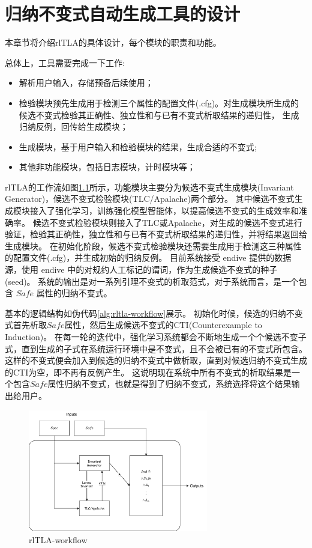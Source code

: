 \chapter{归纳不变式自动生成工具的设计}\label{chap:design}

本章节将介绍rlTLA的具体设计，每个模块的职责和功能。

总体上，工具需要完成一下工作:
\begin{itemize}
    \item 解析用户输入，存储预备后续使用；
    \item 检验模块预先生成用于检测三个属性的配置文件(.cfg)。对生成模块所生成的候选不变式检验其正确性、独立性和与已有不变式析取结果的递归性，
    生成归纳反例，回传给生成模块；
    \item 生成模块，基于用户输入和检验模块的结果，生成合适的不变式;
    \item 其他非功能模块，包括日志模块，计时模块等；
\end{itemize}

rlTLA的工作流如图\ref{fig:rltla}所示，功能模块主要分为候选不变式生成模块(Invariant Generator)，候选不变式检验模块(TLC/Apalache)两个部分。
其中候选不变式生成模块接入了强化学习，训练强化模型智能体，以提高候选不变式的生成效率和准确率。
候选不变式检验模块则接入了TLC或Apalache，对生成的候选不变式进行验证，检验其正确性，独立性和与已有不变式析取结果的递归性，并将结果返回给生成模块。
在初始化阶段，候选不变式检验模块还需要生成用于检测这三种属性的配置文件(.cfg)，并生成初始的归纳反例。
目前系统接受 endive 提供的数据源，使用 endive 中的对规约人工标记的谓词，作为生成候选不变式的种子(seed)。
系统的输出是对一系列引理不变式的析取范式，对于系统而言，是一个包含 $Safe$ 属性的归纳不变式。

基本的逻辑结构如伪代码\ref{alg:rltla-workflow}展示。
初始化时候，候选的归纳不变式首先析取$Safe$属性，然后生成候选不变式的CTI(Counterexample to Induction)。
在每一轮的迭代中，强化学习系统都会不断地生成一个个候选不变子式，直到生成的子式在系统运行环境中是不变式，且不会被已有的不变式所包含。
这样的不变式便会加入到候选的归纳不变式中做析取，直到对候选归纳不变式生成的CTI为空，即不再有反例产生。
这说明现在系统中所有不变式的析取结果是一个包含$Safe$属性归纳不变式，也就是得到了归纳不变式，系统选择将这个结果输出给用户。


\begin{figure}
    \centering
    \includegraphics[width=0.7\textwidth]{figures/workflow.pdf}
    \caption{rlTLA-workflow}
    \label{fig:rltla}
\end{figure}


